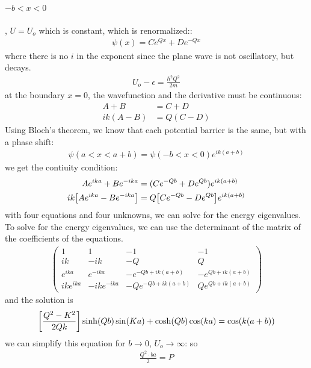 \documentclass[../main.tex]{subfiles}
\begin{document}
\paragraph*{$-b < x < 0$}, $U = U_o$ which is constant, which is renormalized::
\begin{align*}
    \psi(x) = C e^{Qx} + D e^{-Qx}
\end{align*}
where there is no $i$ in the exponent since the plane wave is not oscillatory, but decays.
\begin{align*}
    U_o - \epsilon = \frac{\hbar^2 Q^2}{2m}
\end{align*}
at the boundary $x = 0$, the wavefunction and the derivative must be continuous:
\begin{align*}
    A + B &= C + D \\
    ik(A - B) &= Q(C - D)
\end{align*}
Using Bloch's theorem, we know that each potential barrier is the same, but with a phase shift:
\begin{align*}
    \psi(a < x < a + b) = \psi(-b < x < 0) e^{ik(a+b)}
\end{align*}
we get the contiuity condition:
\begin{align*}
    Ae^{ika} + Be^{-ika} &= (Ce^{-Qb} + De^{Qb})e^{ik(a+b)} \\
    ik\qt[Ae^{ika} - Be^{-ika}] &= Q\qt[Ce^{-Qb} - De^{Qb}]e^{ik(a+b)}
\end{align*}
with four equations and four unknowns, we can solve for the energy eigenvalues. To solve for the
energy eigenvalues, we can use the determinant of the matrix of the coefficients of the equations.
\begin{align*}
    \begin{pmatrix}
        1 & 1 & -1 & -1 \\
        ik & -ik & -Q & Q \\
        e^{ika} & e^{-ika} & -e^{-Qb+ik(a+b)} & -e^{Qb + ik(a+b)} \\
        ik e^{ika} & -ik e^{-ika} & -Q e^{-Qb+ik(a+b)} & Q e^{Qb + ik(a+b)}
    \end{pmatrix}
\end{align*}
and the solution is
\begin{align*}
    \qt[\frac{Q^2 - K^2}{2Qk}] \sinh(Qb) \sin(Ka) + \cosh(Qb) \cos(ka) = \cos (k(a+b))
\end{align*}
we can simplify this equation for $b \to 0$, $U_o \to \infty$: so
\begin{align*}
    \frac{Q^2 \cdot ba}{2} = P
\end{align*}
\end{document}
